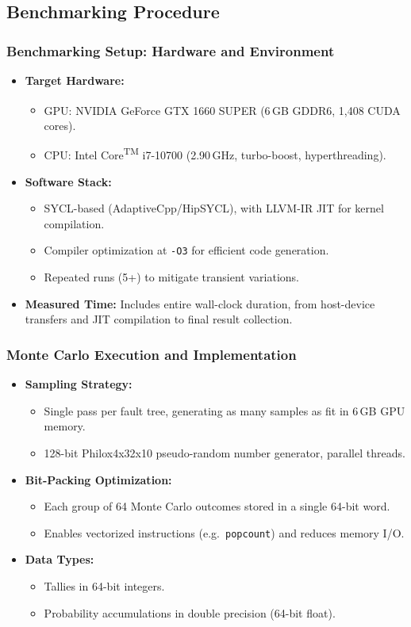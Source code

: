 \subsection{Benchmarking Procedure}
\begin{frame}[t]
\frametitle{Benchmarking Setup: Hardware and Environment}
\begin{itemize}
  \item \textbf{Target Hardware:}
    \begin{itemize}
      \item GPU: NVIDIA\textsuperscript{\textregistered} GeForce GTX 1660 SUPER (6\,GB GDDR6, 1{,}408 CUDA cores).
      \item CPU: Intel\textsuperscript{\textregistered} Core\textsuperscript{TM} i7-10700 (2.90\,GHz, turbo-boost, hyperthreading).
    \end{itemize}
  \item \textbf{Software Stack:}
    \begin{itemize}
      \item SYCL-based (AdaptiveCpp/HipSYCL), with LLVM-IR JIT for kernel compilation.
      \item Compiler optimization at \texttt{-O3} for efficient code generation.
      \item Repeated runs (5+) to mitigate transient variations.
    \end{itemize}
  \item \textbf{Measured Time:} Includes entire wall-clock duration, from host-device transfers and JIT compilation to final result collection.
\end{itemize}
\end{frame}

\begin{frame}[t]
\frametitle{Monte Carlo Execution and Implementation}
\begin{itemize}
  \item \textbf{Sampling Strategy:}
    \begin{itemize}
      \item Single pass per fault tree, generating as many samples as fit in 6\,GB GPU memory.  
      \item 128-bit Philox4x32x10 pseudo-random number generator, parallel threads.
    \end{itemize}
  \item \textbf{Bit-Packing Optimization:}
    \begin{itemize}
      \item Each group of 64 Monte Carlo outcomes stored in a single 64-bit word.  
      \item Enables vectorized instructions (e.g.\ \texttt{popcount}) and reduces memory I/O.
    \end{itemize}
  \item \textbf{Data Types:}
    \begin{itemize}
      \item Tallies in 64-bit integers.  
      \item Probability accumulations in double precision (64-bit float).  
    \end{itemize}
\end{itemize}
\end{frame}

